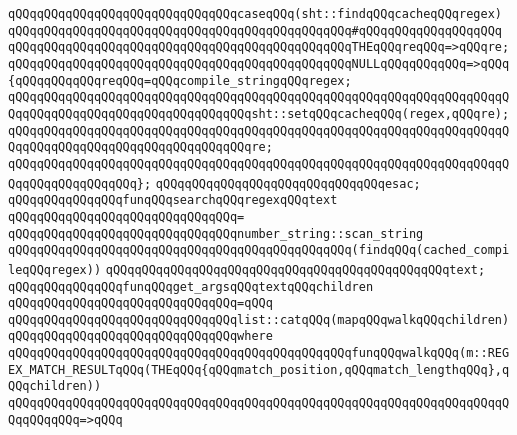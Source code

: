 \verb|qQQqqQQqqQQqqQQqqQQqqQQqqQQqqQQqcaseqQQq(sht::findqQQqcacheqQQqregex)|\newline
\verb|qQQqqQQqqQQqqQQqqQQqqQQqqQQqqQQqqQQqqQQqqQQqqQQq#qQQqqQQqqQQqqQQqqQQq|\newline
\verb|qQQqqQQqqQQqqQQqqQQqqQQqqQQqqQQqqQQqqQQqqQQqqQQqTHEqQQqreqQQq=>qQQqre;|\newline
\newline
\verb|qQQqqQQqqQQqqQQqqQQqqQQqqQQqqQQqqQQqqQQqqQQqqQQqNULLqQQqqQQqqQQq=>qQQq{qQQqqQQqqQQqreqQQq=qQQqcompile_stringqQQqregex;|\newline
\verb|qQQqqQQqqQQqqQQqqQQqqQQqqQQqqQQqqQQqqQQqqQQqqQQqqQQqqQQqqQQqqQQqqQQqqQQqqQQqqQQqqQQqqQQqqQQqqQQqqQQqqQQqsht::setqQQqcacheqQQq(regex,qQQqre);|\newline
\verb|qQQqqQQqqQQqqQQqqQQqqQQqqQQqqQQqqQQqqQQqqQQqqQQqqQQqqQQqqQQqqQQqqQQqqQQqqQQqqQQqqQQqqQQqqQQqqQQqqQQqqQQqre;|\newline
\verb|qQQqqQQqqQQqqQQqqQQqqQQqqQQqqQQqqQQqqQQqqQQqqQQqqQQqqQQqqQQqqQQqqQQqqQQqqQQqqQQqqQQqqQQq};|\newline
\verb|qQQqqQQqqQQqqQQqqQQqqQQqqQQqqQQqesac;|\newline
\newline
\newline
\verb|qQQqqQQqqQQqqQQqfunqQQqsearchqQQqregexqQQqtext|\newline
\verb|qQQqqQQqqQQqqQQqqQQqqQQqqQQqqQQq=|\newline
\verb|qQQqqQQqqQQqqQQqqQQqqQQqqQQqqQQqnumber_string::scan_string|\newline
\verb|qQQqqQQqqQQqqQQqqQQqqQQqqQQqqQQqqQQqqQQqqQQqqQQq(findqQQq(cached_compileqQQqregex))|\newline
\verb|qQQqqQQqqQQqqQQqqQQqqQQqqQQqqQQqqQQqqQQqqQQqqQQqtext;|\newline
\newline
\newline
\verb|qQQqqQQqqQQqqQQqfunqQQqget_argsqQQqtextqQQqchildren|\newline
\verb|qQQqqQQqqQQqqQQqqQQqqQQqqQQqqQQq=qQQq|\newline
\verb|qQQqqQQqqQQqqQQqqQQqqQQqqQQqqQQqlist::catqQQq(mapqQQqwalkqQQqchildren)|\newline
\verb|qQQqqQQqqQQqqQQqqQQqqQQqqQQqqQQqwhere|\newline
\verb|qQQqqQQqqQQqqQQqqQQqqQQqqQQqqQQqqQQqqQQqqQQqqQQqfunqQQqwalkqQQq(m::REGEX_MATCH_RESULTqQQq(THEqQQq{qQQqmatch_position,qQQqmatch_lengthqQQq},qQQqchildren))|\newline
\verb|qQQqqQQqqQQqqQQqqQQqqQQqqQQqqQQqqQQqqQQqqQQqqQQqqQQqqQQqqQQqqQQqqQQqqQQqqQQqqQQq=>qQQq|\newline

